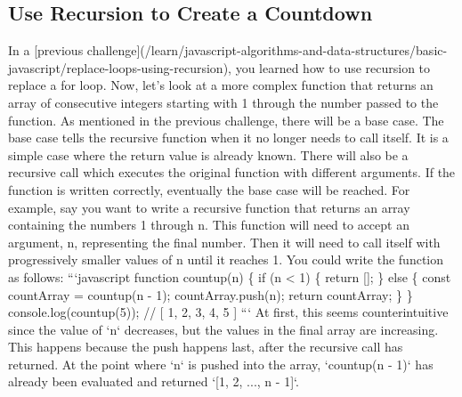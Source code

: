 \documentclass{article}%
\begin{document}
%
\subsection{Use Recursion to Create a Countdown}%
\label{subsec:UseRecursiontoCreateaCountdown}%
In a {[}previous challenge{]}(/learn/javascript{-}algorithms{-}and{-}data{-}structures/basic{-}javascript/replace{-}loops{-}using{-}recursion), you learned how to use recursion to replace a for loop. Now, let's look at a more complex function that returns an array of consecutive integers starting with 1 through the number passed to the function.\newline%
As mentioned in the previous challenge, there will be a base case.  The base case tells the recursive function when it no longer needs to call itself.  It is a simple case where the return value is already known. There will also be a recursive call which executes the original function with different arguments. If the function is written correctly, eventually the base case will be reached.\newline%
For example, say you want to write a recursive function that returns an array containing the numbers 1 through n.  This function will need to accept an argument, n, representing the final number. Then it will need to call itself with progressively smaller values of n until it reaches 1. You could write the function as follows:\newline%
```javascript\newline%
function countup(n) \{\newline%
  if (n < 1) \{\newline%
    return {[}{]};\newline%
  \} else \{\newline%
    const countArray = countup(n {-} 1);\newline%
    countArray.push(n);\newline%
    return countArray;\newline%
  \}\newline%
\}\newline%
console.log(countup(5)); // {[} 1, 2, 3, 4, 5 {]}\newline%
```\newline%
At first, this seems counterintuitive since the value of `n` decreases, but the values in the final array are increasing.  This happens because the push happens last, after the recursive call has returned.  At the point where `n` is pushed into the array, `countup(n {-} 1)` has already been evaluated and returned `{[}1, 2, ..., n {-} 1{]}`.\newline%
\end{document}
